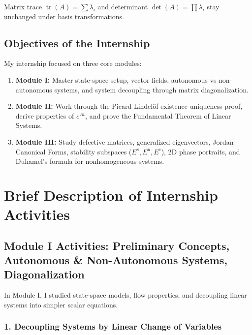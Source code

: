 \documentclass[12pt,a4paper,oneside]{article}
\theoremstyle{definition}
\theoremstyle{plain}
\begin{document}
\smallskip
Matrix trace $\operatorname{tr}(A) = \sum \lambda_i$ and determinant $\det(A) = \prod \lambda_i$ stay unchanged under basis transformations.

\subsection{Objectives of the Internship}

\vspace{0.15cm}
My internship focused on three core modules:
\begin{enumerate}[label=\arabic*.]
    \item \textbf{Module I:} Master state-space setup, vector fields, autonomous vs non-autonomous systems, and system decoupling through matrix diagonalization.
    \item \textbf{Module II:} Work through the Picard-Lindelöf existence-uniqueness proof, derive properties of $e^{At}$, and prove the Fundamental Theorem of Linear Systems.
    \item \textbf{Module III:} Study defective matrices, generalized eigenvectors, Jordan Canonical Forms, stability subspaces ($E^s, E^u, E^c$), 2D phase portraits, and Duhamel's formula for nonhomogeneous systems.
\end{enumerate}

\newpage
\section{Brief Description of Internship Activities}
\label{sec:activities}

\subsection{Module I Activities: Preliminary Concepts, Autonomous \& Non-Autonomous Systems, Diagonalization}

In Module I, I studied state-space models, flow properties, and decoupling linear systems into simpler scalar equations.

\subsubsection{1. Decoupling Systems by Linear Change of Variables}
\end{document}
